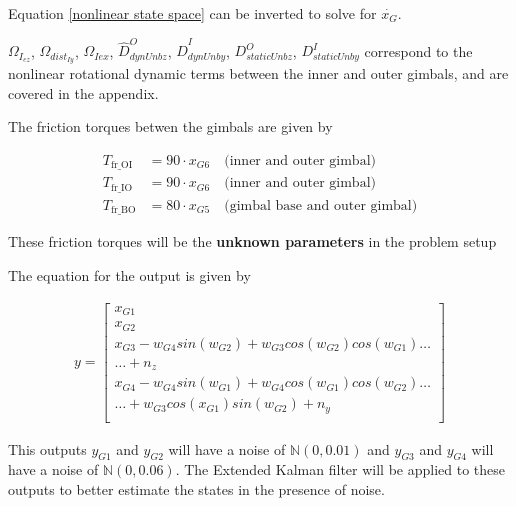 \documentclass[letterpaper, 10 pt, conference]{ieeeconf}  %
\begin{document}
Equation \eqref{nonlinear state space} can be inverted to solve for $\dot{x_G}$.

$\Omega_{I_{ez}}$,  $\Omega_{dist_{Iy}}$, $\Omega_{Iex}$, $\hat{D}^O_{dynUnbz}$, $\hat{D}^I_{dynUnby}$,
$D^O_{staticUnbz}$, $D^I_{staticUnby}$ correspond to the nonlinear rotational dynamic terms between the
inner and outer gimbals, and are covered in the appendix.

The friction torques betwen the gimbals are given by

\begin{equation}
  \begin{aligned}
    T_{\text{fr\_OI}} & = 90 \cdot x_{G6} \quad \text{(inner and outer gimbal)}       \\
    T_{\text{fr\_IO}} & = 90 \cdot x_{G6} \quad \text{(inner and outer gimbal)}       \\
    T_{\text{fr\_BO}} & = 80 \cdot x_{G5} \quad \text{(gimbal base and outer gimbal)}
  \end{aligned}
\end{equation}

These friction torques will be the {\bf unknown parameters} in the problem setup

The equation for the output is given by

\begin{equation}
  \begin{split}
    y = 
    \begin{bmatrix}
      x_{G1}                                                           \\
      x_{G2}                                                           \\
      x_{G3} - w_{G4}sin(w_{G2}) + w_{G3}cos(w_{G2})cos(w_{G1}) \hdots \\ \hdots + n_z                                \\
      x_{G4} - w_{G4}sin(w_{G1}) + w_{G4}cos(w_{G1})cos(w_{G2}) \hdots \\ \hdots + w_{G3}cos(x_{G1})sin(w_{G2}) + n_y \\
    \end{bmatrix}
  \end{split}
\end{equation}

This outputs $y_{G1}$ and $y_{G2}$ will have a noise of $\mathbb{N}(0, 0.01)$ and $y_{G3}$ and $y_{G4}$ will have a noise of $\mathbb{N}(0, 0.06)$.
The Extended Kalman filter will be applied to these outputs to better estimate the states in the presence of noise.
\end{document}

